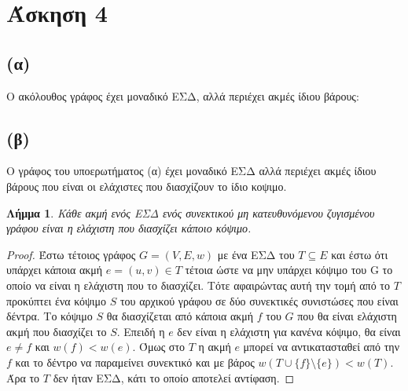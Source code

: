 \documentclass[11pt,a4paper,oneside]{report}
\newtheorem*{lemma}{Λήμμα}
\begin{document}
\pagebreak

\section*{Άσκηση 4}
\subsection*{(α)}

Ο ακόλουθος γράφος έχει μοναδικό ΕΣΔ, αλλά περιέχει ακμές ίδιου βάρους:

\begin{figure}[ht]
	\centering
\end{figure}

\subsection*{(β)}
Ο γράφος του υποερωτήματος (α) έχει μοναδικό ΕΣΔ αλλά περιέχει ακμές ίδιου βάρους που είναι οι ελάχιστες που διασχίζουν το ίδιο κοψιμο.

\begin{lemma}
Κάθε ακμή ενός ΕΣΔ ενός συνεκτικού μη κατευθυνόμενου ζυγισμένου γράφου είναι η ελάχιστη που διασχίζει κάποιο κόψιμο.
\end{lemma}
\begin{proof}
Έστω τέτοιος γράφος $G = (V, E, w)$ με ένα ΕΣΔ του $T \subseteq E$ και έστω ότι υπάρχει κάποια ακμή $e = (u, v) \in T$ τέτοια ώστε να μην υπάρχει κόψιμο του G το οποίο να είναι η ελάχιστη που το διασχίζει. Τότε αφαιρώντας αυτή την τομή από το $T$ προκύπτει ένα κόψιμο $S$ του αρχικού γράφου σε δύο συνεκτικές συνιστώσες που είναι δέντρα. Το κόψιμο $S$ θα διασχίζεται από κάποια ακμή $f$ του $G$ που θα είναι ελάχιστη ακμή που διασχίζει το $S$. Επειδή η $e$ δεν είναι η ελάχιστη για κανένα κόψιμο, θα είναι $e \neq f$ και $w(f) < w(e)$. Όμως στο $T$ η ακμή $e$ μπορεί να αντικατασταθεί από την $f$ και το δέντρο να παραμείνει συνεκτικό και με βάρος $w( T \cup \{f\} \setminus \{e\}) < w( T )$. Άρα το $T$ δεν ήταν ΕΣΔ, κάτι το οποίο αποτελεί αντίφαση.
\end{proof}
\end{document}
